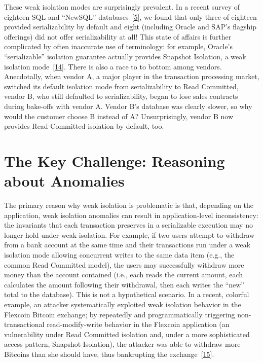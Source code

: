 \documentclass[b5paper,11pt,twoside,openright]{book}
\begin{document}
These weak isolation modes are surprisingly prevalent. In a recent
survey of eighteen SQL and ``NewSQL''
databases~{{[}\protect\hyperlink{ref-hat-vldb}{5}{]}}, we found that
only three of eighteen provided serializability by default and eight
(including Oracle and SAP's flagship offerings) did not offer
serializability at all! This state of affairs is further complicated by
often inaccurate use of terminology: for example, Oracle's
``serializable'' isolation guarantee actually provides Snapshot
Isolation, a weak isolation
mode~{{[}\protect\hyperlink{ref-fekete-ssi}{14}{]}}. There is also a
race to to bottom among vendors. Anecdotally, when vendor A, a major
player in the transaction processing market, switched its default
isolation mode from serializability to Read Committed, vendor B, who
still defaulted to serializability, began to lose sales contracts during
bake-offs with vendor A. Vendor B's database was clearly slower, so why
would the customer choose B instead of A? Unsurprisingly, vendor B now
provides Read Committed isolation by default, too.

\hypertarget{the-key-challenge-reasoning-about-anomalies}{%
\section[Reasoning about Anomalies]{The Key Challenge: Reasoning about Anomalies}
\label{the-key-challenge-reasoning-about-anomalies}
}

The primary reason why weak isolation is problematic is that, depending
on the application, weak isolation anomalies can result in
application-level inconsistency: the invariants that each transaction
preserves in a serializable execution may no longer hold under weak
isolation. For example, if two users attempt to withdraw from a bank
account at the same time and their transactions run under a weak
isolation mode allowing concurrent writes to the same data item (e.g.,
the common Read Committed model), the users may successfully withdraw
more money than the account contained (i.e., each reads the current
amount, each calculates the amount following their withdrawal, then each
writes the ``new'' total to the database). This is not a hypothetical
scenario. In a recent, colorful example, an attacker systematically
exploited weak isolation behavior in the Flexcoin Bitcoin exchange; by
repeatedly and programmatically triggering non-transactional
read-modify-write behavior in the Flexcoin application (an vulnerability
under Read Committed isolation and, under a more sophisticated access
pattern, Snapshot Isolation), the attacker was able to withdraw more
Bitcoins than she should have, thus bankrupting the
exchange~{{[}\protect\hyperlink{ref-flexcoin}{15}{]}}.
\end{document}
